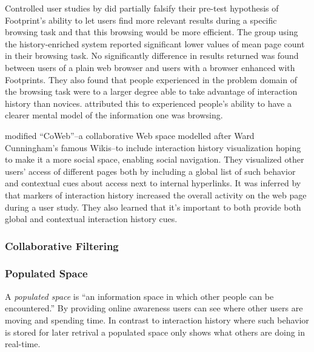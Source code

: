 Controlled user studies by \citeauthor{wexelblat99} did partially falsify
their pre-test hypothesis of Footprint's ability to let users find more
relevant results during a specific browsing task and that this browsing
would be more efficient. The group using the history-enriched system reported
significant lower values of mean page count in their browsing task. No
significantly difference in results returned was found between users of a
plain web browser and users with a browser enhanced with Footprints. They also
found that people experienced in the problem domain of the browsing task were
to a larger degree able to take advantage of interaction history than novices.
\citeauthor{wexelblat99} attributed this to experienced people's ability to
have a clearer mental model of the information one was browsing.

\citet{dieberger00a} modified ``CoWeb''--a collaborative Web space
modelled after Ward Cunningham's famous Wikis--to include interaction history
visualization hoping to make it a more social space, enabling social
navigation. They visualized other users' access of different pages both by
including a global list of such behavior and contextual cues about access
next to internal hyperlinks.
It was inferred by \citeauthor{dieberger00a} that markers of interaction
history increased the overall activity on the web page during a user study.
They also learned that it's important to both provide both global and
contextual interaction history cues.


\subsubsection{Collaborative Filtering}


\subsubsection{Populated Space}

A \emph{populated space} is
  ``an information space in which other people
  can be encountered.'' \citep[p.~41]{dieberger00b}
By providing online awareness users can see where other users are moving and
spending time. In contrast to interaction history where such behavior is
stored for later retrival a populated space only shows what others are doing
in real-time.

